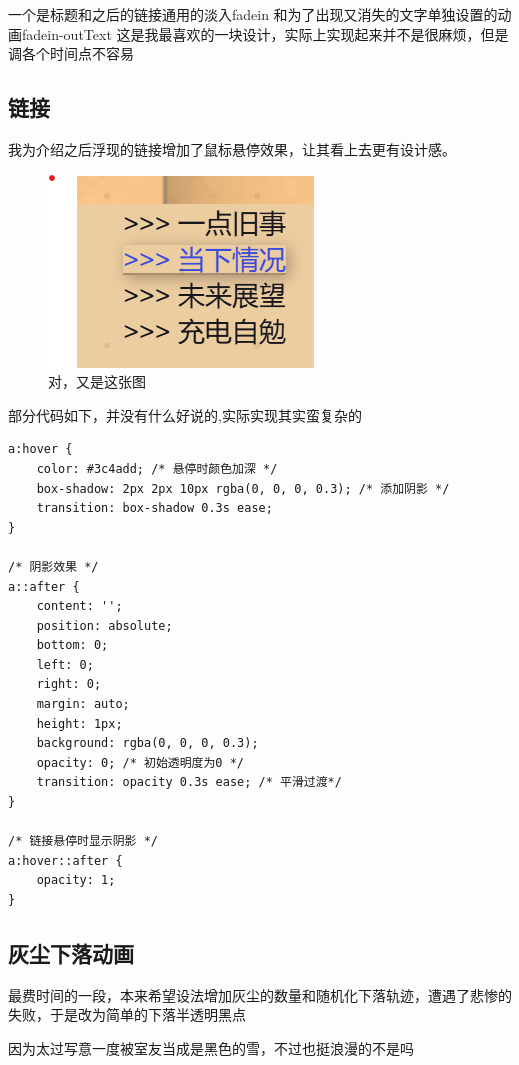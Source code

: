 \documentclass[supercite]{Experimental_Report}
\theoremstyle{definition}
\begin{document}
一个是标题和之后的链接通用的淡入fadein 和为了出现又消失的文字单独设置的动画fadein-outText
这是我最喜欢的一块设计，实际上实现起来并不是很麻烦，但是调各个时间点不容易
\subsection{链接}
我为介绍之后浮现的链接增加了鼠标悬停效果，让其看上去更有设计感。

\begin{figure}[htb] %
	\begin{center}
		\includegraphics[scale=0.40]{images/zhuye-3.png}
		\caption{对，又是这张图}
		\label{fig2-5}
	\end{center}
\end{figure}

部分代码如下，并没有什么好说的,实际实现其实蛮复杂的

\begin{verbatim}
a:hover {
	color: #3c4add; /* 悬停时颜色加深 */
	box-shadow: 2px 2px 10px rgba(0, 0, 0, 0.3); /* 添加阴影 */
	transition: box-shadow 0.3s ease; 
}

/* 阴影效果 */
a::after {
	content: '';
	position: absolute;
	bottom: 0;
	left: 0;
	right: 0;
	margin: auto;
	height: 1px; 
	background: rgba(0, 0, 0, 0.3); 
	opacity: 0; /* 初始透明度为0 */
	transition: opacity 0.3s ease; /* 平滑过渡*/
}

/* 链接悬停时显示阴影 */
a:hover::after {
	opacity: 1; 
}
\end{verbatim}

\subsection{灰尘下落动画}
最费时间的一段，本来希望设法增加灰尘的数量和随机化下落轨迹，遭遇了悲惨的失败，于是改为简单的下落半透明黑点

因为太过写意一度被室友当成是黑色的雪，不过也挺浪漫的不是吗
\end{document}
